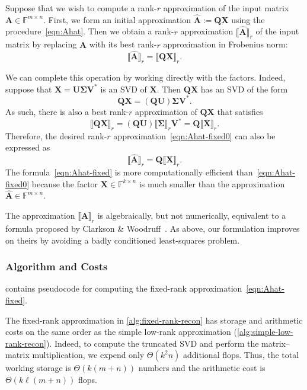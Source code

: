 \documentclass[final]{siamart1116}
\numberwithin{equation}{section}
\numberwithin{theorem}{section}
\numberwithin{figure}{section}
\newcommand{\F}{\mathbb{F}}
\newcommand{\mtx}[1]{\bm{#1}}
\newcommand{\lowrank}[2]{\llbracket {#1} \rrbracket_{#2}}
\begin{document}
Suppose that we wish to compute a rank-$r$ approximation
of the input matrix $\mtx{A} \in \F^{m \times n}$.
First, we form an initial approximation $\hat{\mtx{A}} := \mtx{QX}$
using the procedure~\cref{eqn:Ahat}.  Then we obtain a rank-$r$
approximation $\lowrank{\hat{\mtx{A}}}{r}$ of the input matrix
by replacing $\hat{\mtx{A}}$ with its best rank-$r$ approximation
in Frobenius norm:
\begin{equation} \label{eqn:Ahat-fixed0}
\lowrank{\hat{\mtx{A}}}{r} = \lowrank{ \mtx{Q}\mtx{X} }{r}.
\end{equation}

We can complete this operation by working directly
with the factors.  Indeed, suppose that
$\mtx{X} = \mtx{U\Sigma V}^*$ is an SVD of $\mtx{X}$.
Then $\mtx{QX}$ has an SVD of the form
$$
\mtx{QX} = (\mtx{QU}) \mtx{\Sigma} \mtx{V}^*.
$$
As such, there is also a best rank-$r$ approximation of $\mtx{QX}$ that satisfies
$$
\lowrank{\mtx{QX}}{r} = (\mtx{QU}) \lowrank{\mtx{\Sigma}}{r} \mtx{V}^*
	= \mtx{Q} \lowrank{\mtx{X}}{r}.
$$
Therefore, the desired rank-$r$ approximation~\cref{eqn:Ahat-fixed0}
can also be expressed as
\begin{equation} \label{eqn:Ahat-fixed}
\lowrank{\hat{\mtx{A}}}{r} = \mtx{Q} \lowrank{\mtx{X}}{r}.
\end{equation}
The formula~\cref{eqn:Ahat-fixed} is more computationally
efficient than~\cref{eqn:Ahat-fixed0}
because the factor $\mtx{X} \in \F^{k \times n}$
is much smaller than the approximation $\hat{\mtx{A}} \in \F^{m \times n}$.

\begin{remark}
The approximation $\lowrank{\hat{\mtx{A}}}{r}$ is algebraically, but not numerically,
equivalent to a formula proposed by Clarkson \& Woodruff~\cite[Thm.~4.8]{CW09:Numerical-Linear}.
As above, our formulation improves on theirs by avoiding
a badly conditioned least-squares problem.
\end{remark}


\subsubsection{Algorithm and Costs}

 contains pseudocode for
computing the fixed-rank approximation~\cref{eqn:Ahat-fixed}.

The fixed-rank approximation in \cref{alg:fixed-rank-recon}
has storage and arithmetic costs on the same order as the simple
low-rank approximation (\cref{alg:simple-low-rank-recon}).
Indeed, to compute the truncated SVD and perform the matrix--matrix multiplication, we expend only $\Theta(k^2 n)$ additional flops.
Thus, the total working storage is $\Theta(k (m + n))$ numbers
and the arithmetic cost is $\Theta(k\ell(m+n))$ flops.
\end{document}

